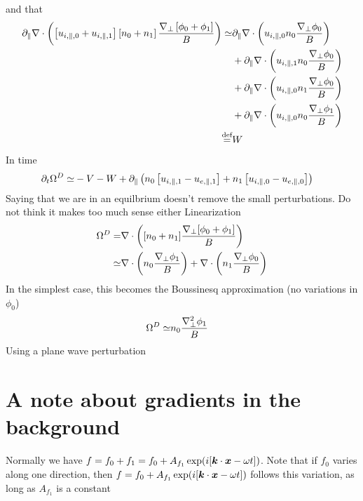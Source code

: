 and that
\begin{align*}
    \partial_\|\nabla\cdot \left(
  \left[ u_{i,\|,0} + u_{i,\|,1} \right]
  \left[ n_0 + n_1 \right]
  \frac{\nabla_\perp
  \left[ \phi_0 + \phi_1 \right]
  }{B}\right)
  \simeq&
    \partial_\|\nabla\cdot \left( u_{i,\|,0} n_0 \frac{\nabla_\perp \phi_0 }{B}\right)
    \\&
    + \partial_\|\nabla\cdot \left( u_{i,\|,1} n_0 \frac{\nabla_\perp \phi_0 }{B}\right)
    \\&
    + \partial_\|\nabla\cdot \left( u_{i,\|,0} n_1 \frac{\nabla_\perp \phi_0 }{B}\right)
    \\&
    + \partial_\|\nabla\cdot \left( u_{i,\|,0} n_0 \frac{\nabla_\perp \phi_1 }{B}\right)
    \\
    \overset{\text{def}}{=}& W
\end{align*}
In time
\begin{align*}
  \partial_t \Omega^D
  \simeq&
  - V
  - W
 + \partial_\| \left(n_0\left[ u_{i,\|,1} - u_{e,\|,1} \right]+n_1\left[ u_{i,\|,0} - u_{e,\|,0} \right]\right)
\end{align*}
%
Saying that we are in an equilbrium doesn't remove the small perturbations.
Do not think it makes too much sense either
%
Linearization
\begin{align*}
    \Omega^D =& \nabla\cdot\left([n_0+n_1]\frac{\nabla_\perp[\phi_0+\phi_1]}{B}\right)\\
    \simeq&
    \nabla\cdot\left(n_0\frac{\nabla_\perp\phi_1}{B}\right)
    + \nabla\cdot\left(n_1\frac{\nabla_\perp\phi_0}{B}\right)
\end{align*}
In the simplest case, this becomes the Boussinesq approximation (no variations in $\phi_0$)
\begin{align*}
    \Omega^D
    \simeq&
    n_0\frac{\nabla_\perp^2\phi_1}{B}
\end{align*}
Using a plane wave perturbation

\section{A note about gradients in the background}
%
Normally we have $f=f_0+f_1=f_0+A_{f_1}\exp(i[\boldsymbol{k}\cdot\boldsymbol{x}-\omega t])$.
Note that if $f_0$ varies along one direction, then $f=f_0+A_{f_1}\exp(i[\boldsymbol{k}\cdot\boldsymbol{x}-\omega t])$ follows this variation, as long as $A_{f_1}$ is a constant
